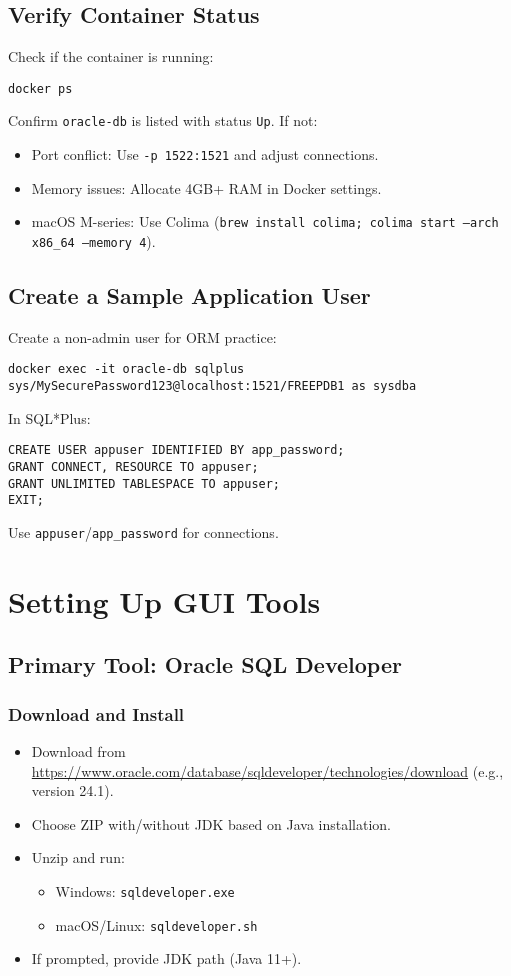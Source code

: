 \documentclass[a4paper,12pt]{article}
\begin{document}
\subsection{Verify Container Status}
Check if the container is running:
\begin{lstlisting}
docker ps
\end{lstlisting}
Confirm \texttt{oracle-db} is listed with status \texttt{Up}. If not:
\begin{itemize}
  \item Port conflict: Use \texttt{-p 1522:1521} and adjust connections.
  \item Memory issues: Allocate 4GB+ RAM in Docker settings.
  \item macOS M-series: Use Colima (\texttt{brew install colima; colima start --arch x86_64 --memory 4}).
\end{itemize}

\subsection{Create a Sample Application User}
Create a non-admin user for ORM practice:
\begin{lstlisting}
docker exec -it oracle-db sqlplus sys/MySecurePassword123@localhost:1521/FREEPDB1 as sysdba
\end{lstlisting}
In SQL*Plus:
\begin{lstlisting}
CREATE USER appuser IDENTIFIED BY app_password;
GRANT CONNECT, RESOURCE TO appuser;
GRANT UNLIMITED TABLESPACE TO appuser;
EXIT;
\end{lstlisting}
Use \texttt{appuser}/\texttt{app_password} for connections.

\section{Setting Up GUI Tools}
\subsection{Primary Tool: Oracle SQL Developer}
\subsubsection{Download and Install}
\begin{itemize}
  \item Download from \url{https://www.oracle.com/database/sqldeveloper/technologies/download} (e.g., version 24.1).
  \item Choose ZIP with/without JDK based on Java installation.
  \item Unzip and run:
    \begin{itemize}
      \item Windows: \texttt{sqldeveloper.exe}
      \item macOS/Linux: \texttt{sqldeveloper.sh}
    \end{itemize}
  \item If prompted, provide JDK path (Java 11+).
\end{itemize}
\end{document}
